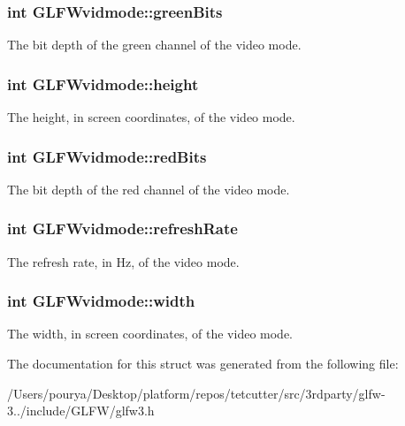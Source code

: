 \subsubsection[{green\+Bits}]{\setlength{\rightskip}{0pt plus 5cm}int G\+L\+F\+Wvidmode\+::green\+Bits}\label{structGLFWvidmode_a292fdd281f3485fb3ff102a5bda43faa}
The bit depth of the green channel of the video mode. \hypertarget{structGLFWvidmode_ac65942a5f6981695517437a9d571d03c}{}
\subsubsection[{height}]{\setlength{\rightskip}{0pt plus 5cm}int G\+L\+F\+Wvidmode\+::height}\label{structGLFWvidmode_ac65942a5f6981695517437a9d571d03c}
The height, in screen coordinates, of the video mode. \hypertarget{structGLFWvidmode_a6066c4ecd251098700062d3b735dba1b}{}
\subsubsection[{red\+Bits}]{\setlength{\rightskip}{0pt plus 5cm}int G\+L\+F\+Wvidmode\+::red\+Bits}\label{structGLFWvidmode_a6066c4ecd251098700062d3b735dba1b}
The bit depth of the red channel of the video mode. \hypertarget{structGLFWvidmode_a791bdd6c7697b09f7e9c97054bf05649}{}
\subsubsection[{refresh\+Rate}]{\setlength{\rightskip}{0pt plus 5cm}int G\+L\+F\+Wvidmode\+::refresh\+Rate}\label{structGLFWvidmode_a791bdd6c7697b09f7e9c97054bf05649}
The refresh rate, in Hz, of the video mode. \hypertarget{structGLFWvidmode_a698dcb200562051a7249cb6ae154c71d}{}
\subsubsection[{width}]{\setlength{\rightskip}{0pt plus 5cm}int G\+L\+F\+Wvidmode\+::width}\label{structGLFWvidmode_a698dcb200562051a7249cb6ae154c71d}
The width, in screen coordinates, of the video mode. 

The documentation for this struct was generated from the following file\+:\begin{DoxyCompactItemize}
\item 
/\+Users/pourya/\+Desktop/platform/repos/tetcutter/src/3rdparty/glfw-\/3../include/\+G\+L\+F\+W/glfw3.\+h\end{DoxyCompactItemize}
